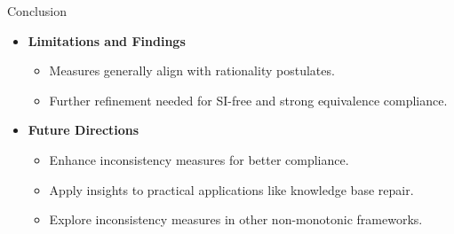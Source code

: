 \begin{frame}{Conclusion}
    \begin{itemize}
        \item \textbf{Limitations and Findings}
              \begin{itemize}
                  \item Measures generally align with rationality postulates.
                  \item Further refinement needed for SI-free and strong equivalence compliance.
              \end{itemize}
        \item \textbf{Future Directions}
              \begin{itemize}
                  \item Enhance inconsistency measures for better compliance.
                  \item Apply insights to practical applications like knowledge base repair.
                  \item Explore inconsistency measures in other non-monotonic frameworks.
              \end{itemize}
    \end{itemize}
\end{frame}
